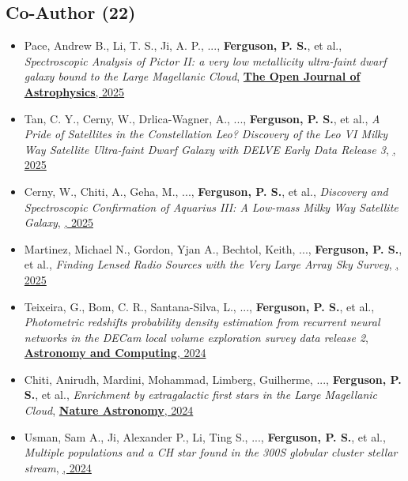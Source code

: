 \subsection{Co-Author  (22)}
\begin{itemize}[itemsep=1pt]
    \item {Pace}, Andrew B., {Li}, T. S., {Ji}, A. P., ..., \textbf{Ferguson, P. S.}, et al., \textit{{Spectroscopic Analysis of Pictor II: a very low metallicity ultra-faint dwarf galaxy bound to the Large Magellanic Cloud}}, \href{https://ui.adsabs.harvard.edu/abs/2025OJAp....8E.112P}{\textbf{The Open Journal of Astrophysics}, 2025}
    \item {Tan}, C. Y., {Cerny}, W., {Drlica-Wagner}, A., ..., \textbf{Ferguson, P. S.}, et al., \textit{{A Pride of Satellites in the Constellation Leo? Discovery of the Leo VI Milky Way Satellite Ultra-faint Dwarf Galaxy with DELVE Early Data Release 3}}, \href{https://ui.adsabs.harvard.edu/abs/2025ApJ...979..176T}{\textbf{\apj}, 2025}
    \item {Cerny}, W., {Chiti}, A., {Geha}, M., ..., \textbf{Ferguson, P. S.}, et al., \textit{{Discovery and Spectroscopic Confirmation of Aquarius III: A Low-mass Milky Way Satellite Galaxy}}, \href{https://ui.adsabs.harvard.edu/abs/2025ApJ...979..164C}{\textbf{\apj}, 2025}
    \item {Martinez}, Michael N., {Gordon}, Yjan A., {Bechtol}, Keith, ..., \textbf{Ferguson, P. S.}, et al., \textit{{Finding Lensed Radio Sources with the Very Large Array Sky Survey}}, \href{https://ui.adsabs.harvard.edu/abs/2025ApJ...979..132M}{\textbf{\apj}, 2025}
    \item {Teixeira}, G., {Bom}, C. R., {Santana-Silva}, L., ..., \textbf{Ferguson, P. S.}, et al., \textit{{Photometric redshifts probability density estimation from recurrent neural networks in the DECam local volume exploration survey data release 2}}, \href{https://ui.adsabs.harvard.edu/abs/2024A&C....4900886T}{\textbf{Astronomy and Computing}, 2024}
    \item {Chiti}, Anirudh, {Mardini}, Mohammad, {Limberg}, Guilherme, ..., \textbf{Ferguson, P. S.}, et al., \textit{{Enrichment by extragalactic first stars in the Large Magellanic Cloud}}, \href{https://ui.adsabs.harvard.edu/abs/2024NatAs...8..637C}{\textbf{Nature Astronomy}, 2024}
    \item {Usman}, Sam A., {Ji}, Alexander P., {Li}, Ting S., ..., \textbf{Ferguson, P. S.}, et al., \textit{{Multiple populations and a CH star found in the 300S globular cluster stellar stream}}, \href{https://ui.adsabs.harvard.edu/abs/2024MNRAS.529.2413U}{\textbf{\mnras}, 2024}

\end{itemize}
